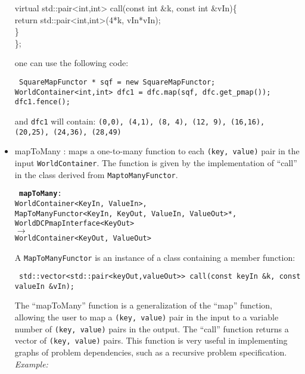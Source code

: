 \documentclass{article}
\begin{document}
\begin{itemize}
{       virtual std::pair<int,int> call(const int \&k, const int \&vIn)\{\\
         return std::pair<int,int>(4*k, vIn*vIn);\\
       \}\\
     \};\\
    }
    
    one can use the following code:

    {\tt
     SquareMapFunctor * sqf = new SquareMapFunctor;\\
     WorldContainer<int,int> dfc1 = dfc.map(sqf, dfc.get\_pmap());\\
     dfc1.fence();\\
    }

    and {\tt dfc1} will contain: {\tt (0,0), (4,1), (8, 4), (12, 9), (16,16), 
    (20,25), (24,36), (28,49) }
 
  \item mapToMany : maps a one-to-many function to each {\tt (key, value)}
pair in the input {\tt WorldContainer}.  The function is given by the
implementation of ``call'' in the class derived from {\tt MaptoManyFunctor}.

   {\tt 
    {\bf mapToMany}:\\ 
    WorldContainer<KeyIn, ValueIn>,\\
    MapToManyFunctor<KeyIn, KeyOut, ValueIn, ValueOut>*,\\
    WorldDCPmapInterface<KeyOut>\\
    $\rightarrow$\\
    WorldContainer<KeyOut, ValueOut>\\
    }

    A {\tt MapToManyFunctor} is an instance of a class containing a member function:

    {\tt
    std::vector<std::pair<keyOut,valueOut>> call(const keyIn \&k, const valueIn \&vIn);\\
    }

    The ``mapToMany'' function is a generalization of the ``map'' function,
allowing the user to map a {\tt (key, value)} pair in the input to a variable
number of {\tt (key, value)} pairs in the output. The ``call'' function
returns a vector of {\tt (key, value)} pairs. This function is very useful in
implementing graphs of problem dependencies, such as a recursive problem
specification.\\

   {\em Example:}\\
   

\end{itemize}
\end{document}
